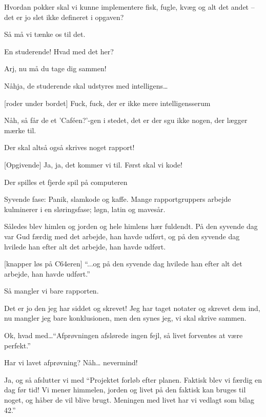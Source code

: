 \documentclass[danish]{article}
\begin{document}
\begin{sketch}
 Hvordan pokker skal vi kunne implementere fisk, fugle, kvæg og alt det
andet -- det er jo slet ikke defineret i opgaven?

 Så må vi tænke os til det.

 En studerende! Hvad med det her? 

 Arj, nu må du tage dig sammen!

 Nåhja, de studerende skal udstyres med intelligens\ldots

[roder under bordet] Fuck, fuck, der er ikke mere intelligensserum

 Nåh, så får de et 'Caféen?'-gen i stedet, det er der sgu
ikke nogen, der lægger mærke til.

 Der skal altså også skrives noget rapport!

[Opgivende] Ja, ja, det kommer vi til. Først skal vi kode!

\scene Der spilles et fjerde spil på computeren


 Syvende fase: Panik, slamkode og kaffe. Mange rapportgruppers arbejde
kulminerer i en sløringsfase; løgn, latin og mavesår.

 Således blev himlen og jorden og hele himlens hær
fuldendt. På den syvende dag var Gud færdig med det arbejde, han havde
udført, og på den syvende dag hvilede han efter alt det arbejde, han havde
udført.

[knapper løs på C64eren] ``...og på den syvende dag hvilede han efter
alt det arbejde, han havde udført.''

 Så mangler vi bare rapporten.

 Det er jo den jeg har siddet og skrevet! Jeg har taget notater og
skrevet dem ind, nu mangler jeg bare konklusionen, men den synes jeg, vi skal
skrive sammen.

 Ok, hvad med\ldots ``Afprøvningen afslørede ingen fejl, så livet
forventes at være perfekt.''

 Har vi lavet afprøvning? Nåh\ldots {} nevermind!

 Ja, og så afslutter vi med  ``Projektet forløb efter
planen. Faktisk blev vi færdig en dag før tid! Vi mener himmelen, jorden og
livet på den faktisk kan bruges til noget, og håber de vil blive brugt. Meningen
med livet har vi vedlagt som bilag 42.''


\end{sketch}
\end{document}
